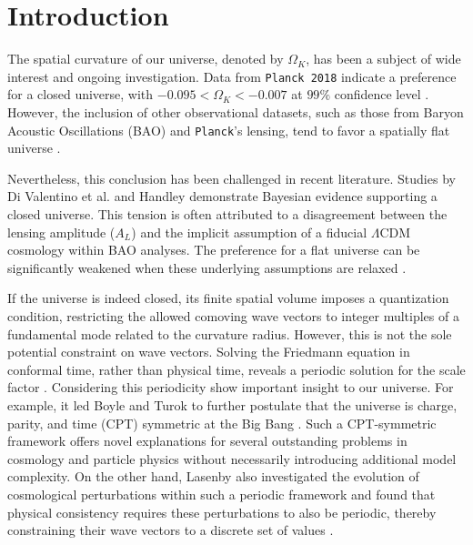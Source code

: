 \documentclass[%
 reprint,
 amsmath,amssymb,
 prd, %
]{revtex4-2}
\begin{document}
\maketitle


\section{Introduction}

The spatial curvature of our universe, denoted by $\Omega_K$, has been a subject of wide interest and ongoing investigation. Data from \texttt{Planck 2018} indicate a preference for a closed universe, with $-0.095 < \Omega_K < -0.007$ at $99\%$ confidence level  \cite{2020A&A...641A...6P}. However, the inclusion of other observational datasets, such as those from Baryon Acoustic Oscillations (BAO) and \texttt{Planck}'s lensing, tend to favor a spatially flat universe \cite{2020A&A...641A...6P, PhysRevD.105.063524}.

Nevertheless, this conclusion has been challenged in recent literature. Studies by Di Valentino et al. \cite{2020NatAs...4..196D} and Handley \cite{2021PhRvD.103d1301H} demonstrate Bayesian evidence supporting a closed universe. This tension is often attributed to a disagreement between the lensing amplitude ($A_L$) and the implicit assumption of a fiducial $\Lambda$CDM cosmology within BAO analyses. The preference for a flat universe can be significantly weakened when these underlying assumptions are relaxed \cite{2022MNRAS.517.3087G}.

If the universe is indeed closed, its finite spatial volume imposes a quantization condition, restricting the allowed comoving wave vectors to integer multiples of a fundamental mode related to the curvature radius. %
However, this is not the sole potential constraint on wave vectors. Solving the Friedmann equation in conformal time, rather than physical time, reveals a periodic solution for the scale factor \cite{2021arXiv210906204B, 2024PhLB..84938442B}.
Considering this periodicity show important insight to our universe. For example, it led Boyle and Turok to further postulate that the universe is charge, parity, and time (CPT) symmetric at the Big Bang \cite{2021arXiv211006258B,2022arXiv220810396B,2024PhLB..84938442B,2023arXiv230200344T}. Such a CPT-symmetric framework offers novel explanations for several outstanding problems in cosmology and particle physics without necessarily introducing additional model complexity. %
On the other hand, Lasenby also investigated the evolution of cosmological perturbations within such a periodic framework and found that physical consistency requires these perturbations to also be periodic, thereby constraining their wave vectors to a discrete set of values \cite{2022PhRvD.105h3514L}.
\end{document}
